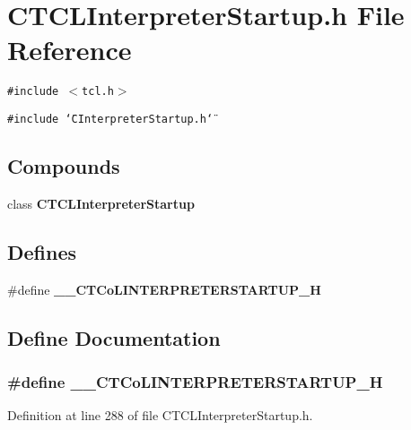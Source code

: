 \section{CTCLInterpreter\-Startup.h File Reference}
\label{CTCLInterpreterStartup_8h}
{\tt \#include $<$tcl.h$>$}\par
{\tt \#include \char`\"{}CInterpreter\-Startup.h\char`\"{}}\par
\subsection*{Compounds}
\begin{CompactItemize}
\item 
class {\bf CTCLInterpreter\-Startup}
\end{CompactItemize}
\subsection*{Defines}
\begin{CompactItemize}
\item 
\#define {\bf \_\-\_\-CTCo\-LINTERPRETERSTARTUP\_\-H}
\end{CompactItemize}


\subsection{Define Documentation}
\subsubsection{\setlength{\rightskip}{0pt plus 5cm}\#define \_\-\_\-CTCo\-LINTERPRETERSTARTUP\_\-H}\label{CTCLInterpreterStartup_8h_a0}




Definition at line 288 of file CTCLInterpreter\-Startup.h.